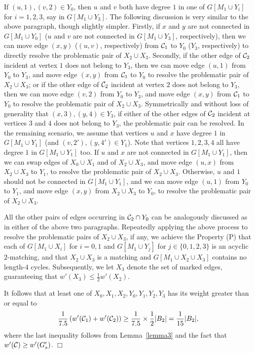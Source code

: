 \documentclass[11pt,twoside]{article}\usepackage{amssymb,latexsym,graphicx,hyperref}\usepackage{epstopdf}
\newenvironment{proof}{{\sc Proof. }}{\hfill$\Box$\vspace{0.2in}}
\begin{document}
\begin{proof}
If $(u, 1), (v, 2) \in Y_0$, then $u$ and $v$ both have degree $1$ in one of $G[M_1 \cup Y_i]$ for $i = 1, 2, 3$, say in $G[M_1 \cup Y_3]$.
The following discussion is very similar to the above paragraph, though slightly simpler.
Firstly, if $x$ and $y$ are not connected in $G[M_1 \cup Y_0]$ ($u$ and $v$ are not connected in $G[M_1 \cup Y_3]$, respectively),
then we can move edge $(x, y)$ ($(u, v)$, respectively) from ${\cal C}_1$ to $Y_0$ ($Y_3$, respectively)
to directly resolve the problematic pair of $X_2 \cup X_3$.
Secondly, if the other edge of ${\cal C}_2$ incident at vertex $1$ does not belong to $Y_3$,
then we can move edge $(u, 1)$ from $Y_0$ to $Y_3$, and move edge $(x, y)$ from ${\cal C}_1$ to $Y_0$ to resolve the problematic pair of $X_2 \cup X_3$;
or if the other edge of ${\cal C}_2$ incident at vertex $2$ does not belong to $Y_3$,
then we can move edge $(v, 2)$ from $Y_0$ to $Y_3$, and move edge $(x, y)$ from ${\cal C}_1$ to $Y_0$ to resolve the problematic pair of $X_2 \cup X_3$.
Symmetrically and without loss of generality that $(x, 3), (y, 4) \in Y_3$,
if either of the other edges of ${\cal C}_2$ incident at vertices $3$ and $4$ does not belong to $Y_3$, the problematic pair can be resolved.
In the remaining scenario, we assume that vertices $u$ and $x$ have degree $1$ in $G[M_1 \cup Y_1]$ (and $(v, 2'), (y, 4') \in Y_1$).
Note that vertices $1, 2, 3, 4$ all have degree $1$ in $G[M_1 \cup Y_1]$ too.
If $u$ and $x$ are not connected in $G[M_1 \cup Y_1]$, then we can swap edges of $X_0 \cup X_1$ and of $X_2 \cup X_3$,
and move edge $(u, x)$ from $X_2 \cup X_3$ to $Y_1$, to resolve the problematic pair of $X_2 \cup X_3$.
Otherwise, $u$ and $1$ should not be connected in $G[M_1 \cup Y_1]$,
and we can move edge $(u, 1)$ from $Y_0$ to $Y_1$, and move edge $(x, y)$ from $X_2 \cup X_3$ to $Y_0$,
to resolve the problematic pair of $X_2 \cup X_3$.


All the other pairs of edges occurring in ${\cal C}_2 \cap Y_0$ can be analogously discussed as in either of the above two paragraphs.
Repeatedly applying the above process to resolve the problematic pairs of $X_2 \cup X_3$, if any,
we achieve the Property (P) that each of $G[M_1 \cup X_i]$ for $i = 0, 1$ and $G[M_1 \cup Y_j]$ for $j \in \{0, 1, 2, 3\}$ is an acyclic $2$-matching,
and that $X_2 \cup X_3$ is a matching and $G[M_1 \cup X_2 \cup X_3]$ contains no length-$4$ cycles.
Subsequently, we let $X_3$ denote the set of marked edges, guaranteeing that $w'(X_3) \le \frac 12 w'(X_2)$.


It follows that at least one of $X_0, X_1, X_2, Y_0, Y_1, Y_2, Y_3$ has its weight greater than or equal to
\[
\frac 1{7.5} \left(w'({\cal C}_1) + w'({\cal C}_2)\right) \ge
\frac 1{7.5} \times \frac 12 |B_2| = \frac 1{15} |B_2|,
\]
where the last inequality follows from Lemma~\ref{lemma3} and the fact that $w'({\cal C}) \ge w'(G'_s)$.
\end{proof}
\end{document}

